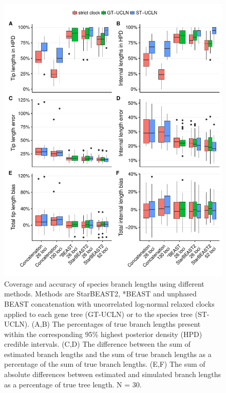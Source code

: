 \documentclass[12pt]{article}
\begin{document}
\begin{figure}[htb!]
\centering
\includegraphics[width=130mm]{branch_length_accuracy_unphased.pdf}
\caption
{Coverage and accuracy of species branch lengths using different methods.
Methods are StarBEAST2, *BEAST and unphased BEAST concatenation with uncorrelated
log-normal relaxed clocks applied to each gene tree (GT-UCLN) or to the species
tree (ST-UCLN). (A,B) The percentages of true branch lengths present within the
corresponding 95\% highest posterior density (HPD) credible intervals. (C,D)
The difference between the sum of estimated branch lengths and the sum of true
branch lengths as a percentage of the sum of true branch lengths. (E,F) The
sum of absolute differences between estimated and simulated branch lengths as
a percentage of true tree length. N = 30.}
\label{fig:branchLengthsError}
\end{figure}

\clearpage
\end{document}
